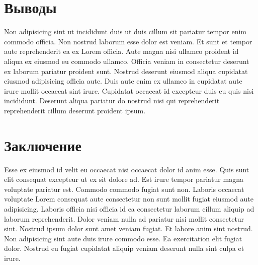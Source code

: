 \documentclass[12pt,a4paper]{report}
\begin{document}
\chapter*{Выводы}

Non adipisicing sint ut incididunt duis ut duis cillum sit pariatur tempor enim commodo officia. Non nostrud laborum esse dolor est veniam. Et sunt et tempor aute reprehenderit ea ex Lorem officia. Aute magna nisi ullamco proident id aliqua ex eiusmod eu commodo ullamco. Officia veniam in consectetur deserunt ex laborum pariatur proident sunt. Nostrud deserunt eiusmod aliqua cupidatat eiusmod adipisicing officia aute. Duis aute enim ex ullamco in cupidatat aute irure mollit occaecat sint irure. Cupidatat occaecat id excepteur duis eu quis nisi incididunt. Deserunt aliqua pariatur do nostrud nisi qui reprehenderit reprehenderit cillum deserunt proident ipsum.


\chapter*{Заключение}

Esse ex eiusmod id velit eu occaecat nisi occaecat dolor id anim esse. Quis sunt elit consequat excepteur ut ex sit dolore ad. Est irure tempor pariatur magna voluptate pariatur est. Commodo commodo fugiat sunt non. Laboris occaecat voluptate Lorem consequat aute consectetur non sunt mollit fugiat eiusmod aute adipisicing. Laboris officia nisi officia id ea consectetur laborum cillum aliquip ad laborum reprehenderit. Dolor veniam nulla ad pariatur nisi mollit consectetur sint. Nostrud ipsum dolor sunt amet veniam fugiat. Et labore anim sint nostrud. Non adipisicing sint aute duis irure commodo esse. Ea exercitation elit fugiat dolor. Nostrud eu fugiat cupidatat aliquip veniam deserunt nulla sint culpa et irure.

\renewcommand\bibname{Cписок литературы}
\end{document}
